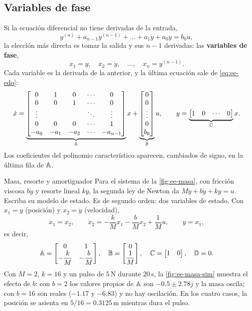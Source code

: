 \subsection{Variables de fase}

Si la ecuación diferencial no tiene derivadas de la entrada,
\begin{equation}
  y^{(n)}+a_{n-1}y^{(n-1)}+\dots+a_1\dot y+a_0y=b_0u,
  \label{eq:ee-edo}
\end{equation}
la elección más directa es tomar la salida y sus $n-1$ derivadas: las \textbf{variables de fase},
\[
  x_1=y,\quad x_2=\dot y,\quad\dots,\quad x_n=y^{(n-1)} .
\]
Cada variable es la derivada de la anterior, y la última ecuación sale de \eqref{eq:ee-edo}:
\begin{equation}
  \dot x=\underbrace{\begin{bmatrix}0&1&0&\cdots&0\\0&0&1&\cdots&0\\\vdots&&&\ddots&\vdots\\0&0&0&\cdots&1\\-a_0&-a_1&-a_2&\cdots&-a_{n-1}\end{bmatrix}}_{\mathbb{A}}x
  +\underbrace{\begin{bmatrix}0\\0\\\vdots\\0\\b_0\end{bmatrix}}_{\mathbb{B}}u,
  \qquad y=\underbrace{\begin{bmatrix}1&0&\cdots&0\end{bmatrix}}_{\mathbb{C}}x .
  \label{eq:ee-fase}
\end{equation}
Los coeficientes del polinomio característico aparecen, cambiados de signo, en la última fila de $\mathbb{A}$.

\begin{ejemplo}[label=ej:ee-masa]{Masa, resorte y amortiguador}
Para el sistema de la \cref{fig:ee-masa}, con fricción viscosa $b\dot y$ y resorte lineal $ky$, la segunda ley de Newton da $M\ddot y+b\dot y+ky=u$. Escriba su modelo de estado.
\solucion Es de segundo orden: dos variables de estado. Con $x_1=y$ (posición) y $x_2=\dot y$ (velocidad),
\[
  \dot x_1=x_2,\qquad \dot x_2=-\frac kMx_1-\frac bMx_2+\frac1Mu,\qquad y=x_1,
\]
es decir,
\[
  \mathbb{A}=\begin{bmatrix}0&1\\-\dfrac kM&-\dfrac bM\end{bmatrix},\quad
  \mathbb{B}=\begin{bmatrix}0\\\dfrac1M\end{bmatrix},\quad
  \mathbb{C}=\begin{bmatrix}1&0\end{bmatrix},\quad \mathbb{D}=0 .
\]
Con $M=2$, $k=16$ y un pulso de $5$\,N durante $20$\,s, la \cref{fig:ee-masa-sim} muestra el efecto de $b$: con $b=2$ los valores propios de $\mathbb{A}$ son $-0.5\pm2.78j$ y la masa oscila; con $b=16$ son reales ($-1.17$ y $-6.83$) y no hay oscilación. En los cuatro casos, la posición se asienta en $5/16=0.3125$\,m mientras dura el pulso.
\end{ejemplo}

